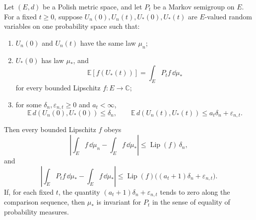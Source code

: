 \begin{lemma}
\label{lem:spde-coupled-stationary-law-comparison}
Let \((E,d)\) be a Polish metric space, and let \(P_t\) be a Markov semigroup
on \(E\).  For a fixed \(t\geq0\), suppose \(U_n(0),U_n(t),U_\ast(0),U_\ast(t)\)
are \(E\)-valued random variables on one probability space such that:
\begin{enumerate}[label=(\roman*)]
  \item \(U_n(0)\) and \(U_n(t)\) have the same law \(\mu_n\);
  \item \(U_\ast(0)\) has law \(\mu_\ast\), and
  \[
    \mathbb E[f(U_\ast(t))]
    =
    \int_E P_tf\,\dd\mu_\ast
  \]
  for every bounded Lipschitz \(f:E\to\mathbb C\);
  \item for some \(\delta_n,\varepsilon_{n,t}\geq0\) and
  \(a_t<\infty\),
  \begin{equation}
    \mathbb E\,d(U_n(0),U_\ast(0))\leq\delta_n,
    \qquad
    \mathbb E\,d(U_n(t),U_\ast(t))
    \leq a_t\delta_n+\varepsilon_{n,t}.
    \label{eq:spde-stationary-coupling-defects}
  \end{equation}
\end{enumerate}
Then every bounded Lipschitz \(f\) obeys
\begin{equation}
  \left|
    \int_E f\,\dd\mu_n-\int_E f\,\dd\mu_\ast
  \right|
  \leq
  \operatorname{Lip}(f)\,\delta_n,
  \label{eq:spde-stationary-law-bl-distance}
\end{equation}
and
\begin{equation}
  \left|
    \int_E P_tf\,\dd\mu_\ast-\int_E f\,\dd\mu_\ast
  \right|
  \leq
  \operatorname{Lip}(f)\bigl((a_t+1)\delta_n+\varepsilon_{n,t}\bigr).
  \label{eq:spde-stationary-law-invariance-defect}
\end{equation}
If, for each fixed \(t\), the quantity
\((a_t+1)\delta_n+\varepsilon_{n,t}\) tends to zero along the comparison
sequence, then \(\mu_\ast\) is invariant for \(P_t\) in the sense of equality
of probability measures.
\end{lemma}

